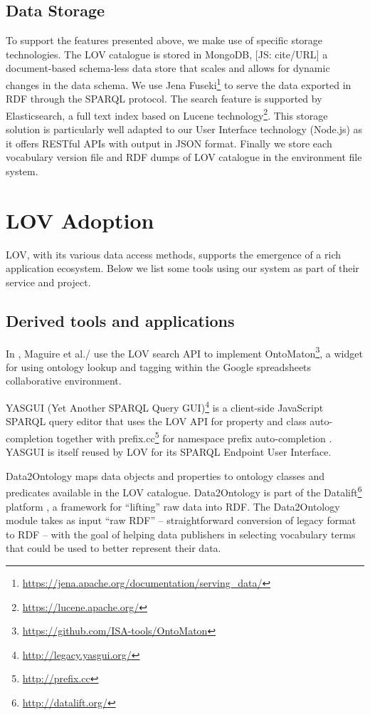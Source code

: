 \documentclass{iosart2c}
\begin{document}
\subsection{Data Storage}

To support the features presented above, we make use of specific storage technologies. The LOV catalogue is stored in MongoDB\textregistered, [JS: cite/URL] a document-based schema-less data store that scales and allows for dynamic changes in the data schema. We use Jena Fuseki\footnote{\url{https://jena.apache.org/documentation/serving_data/}} to serve the data exported in RDF through the SPARQL protocol. The search feature is supported by Elasticsearch\textregistered, a full text index based on Lucene technology\footnote{\url{https://lucene.apache.org/}}. This storage solution is particularly well adapted to our User Interface technology (Node.js) as it offers RESTful APIs with output in JSON format. Finally we store each vocabulary version file and RDF dumps of LOV catalogue in the environment file system.



\section{LOV Adoption}
\label{sec:lovecosystem}
LOV, with its various data access methods, supports the emergence of a rich application ecosystem. Below we list some tools using our system as part of their service and project.
 
\subsection{Derived tools and applications}

In \cite{ontomaton12}, Maguire et al./ use the LOV search API to implement OntoMaton\footnote{\url{https://github.com/ISA-tools/OntoMaton}}, a widget for using ontology lookup and tagging within the Google spreadsheets collaborative environment. 

YASGUI (Yet Another SPARQL Query GUI)\footnote{\url{http://legacy.yasgui.org/}} is a client-side JavaScript SPARQL query editor that uses the LOV API for property and class auto-completion together with prefix.cc\footnote{\url{http://prefix.cc}} for namespace prefix auto-completion \cite{yasgui}. YASGUI is itself reused by LOV for its SPARQL Endpoint User Interface.

Data2Ontology maps data objects and properties to ontology classes and predicates available in the LOV catalogue. Data2Ontology is part of the  Datalift\footnote{\url{http://datalift.org/}} platform \cite{scharffe_2012}, a framework for ``lifting'' raw data into RDF. The Data2Ontology module takes as input ``raw RDF'' -- straightforward conversion of legacy format to RDF -- with the goal of helping data publishers in selecting vocabulary terms that could be used to better represent their data.
\end{document}
